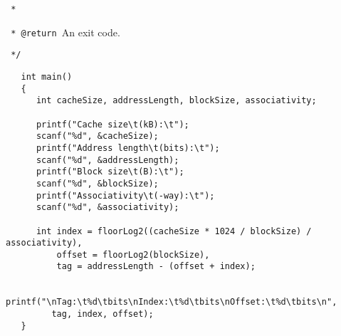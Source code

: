\documentclass[12pt]{article}
\begin{document}
\verb| * |

\verb| * @return |An exit code.

\verb| */|
\begin{verbatim}
   int main()
   {
      int cacheSize, addressLength, blockSize, associativity;
    
      printf("Cache size\t(kB):\t");
      scanf("%d", &cacheSize);
      printf("Address length\t(bits):\t");
      scanf("%d", &addressLength);
      printf("Block size\t(B):\t");
      scanf("%d", &blockSize);
      printf("Associativity\t(-way):\t");
      scanf("%d", &associativity);
    
      int index = floorLog2((cacheSize * 1024 / blockSize) / associativity),
          offset = floorLog2(blockSize),
          tag = addressLength - (offset + index);
    
      printf("\nTag:\t%d\tbits\nIndex:\t%d\tbits\nOffset:\t%d\tbits\n",
         tag, index, offset);
   }
\end{verbatim}
\end{document}
